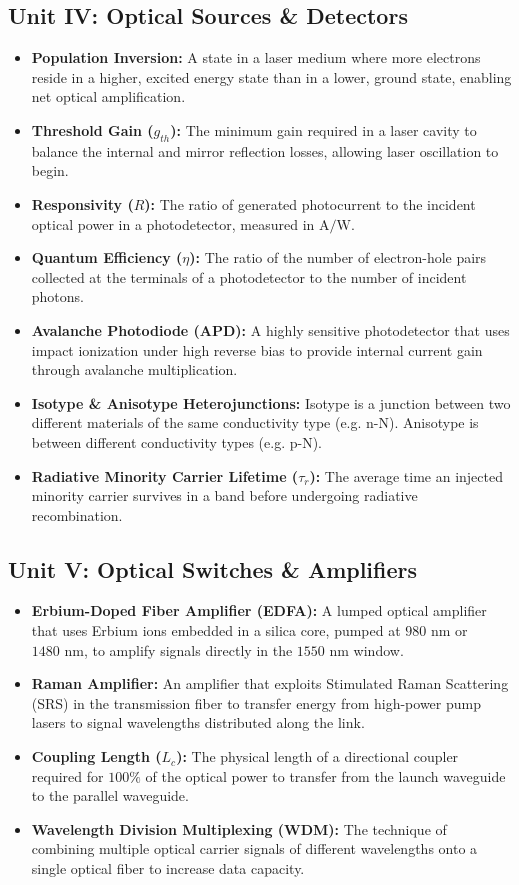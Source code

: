 \subsection{Unit IV: Optical Sources \& Detectors}
\begin{itemize}
  \item   \textbf{Population Inversion:} A state in a laser medium where more electrons reside in a higher, excited energy state than in a lower, ground state, enabling net optical amplification.
  \item   \textbf{Threshold Gain ($g_{th}$):} The minimum gain required in a laser cavity to balance the internal and mirror reflection losses, allowing laser oscillation to begin.
  \item   \textbf{Responsivity ($R$):} The ratio of generated photocurrent to the incident optical power in a photodetector, measured in $\text{A/W}$.
  \item   \textbf{Quantum Efficiency ($\eta$):} The ratio of the number of electron-hole pairs collected at the terminals of a photodetector to the number of incident photons.
  \item   \textbf{Avalanche Photodiode (APD):} A highly sensitive photodetector that uses impact ionization under high reverse bias to provide internal current gain through avalanche multiplication.
  \item   \textbf{Isotype \& Anisotype Heterojunctions:} Isotype is a junction between two different materials of the same conductivity type (e.g. n-N). Anisotype is between different conductivity types (e.g. p-N).
  \item   \textbf{Radiative Minority Carrier Lifetime ($\tau_r$):} The average time an injected minority carrier survives in a band before undergoing radiative recombination.
\end{itemize}


\subsection{Unit V: Optical Switches \& Amplifiers}
\begin{itemize}
  \item   \textbf{Erbium-Doped Fiber Amplifier (EDFA):} A lumped optical amplifier that uses Erbium ions embedded in a silica core, pumped at $980\text{ nm}$ or $1480\text{ nm}$, to amplify signals directly in the $1550\text{ nm}$ window.
  \item   \textbf{Raman Amplifier:} An amplifier that exploits Stimulated Raman Scattering (SRS) in the transmission fiber to transfer energy from high-power pump lasers to signal wavelengths distributed along the link.
  \item   \textbf{Coupling Length ($L_c$):} The physical length of a directional coupler required for $100\%$ of the optical power to transfer from the launch waveguide to the parallel waveguide.
  \item   \textbf{Wavelength Division Multiplexing (WDM):} The technique of combining multiple optical carrier signals of different wavelengths onto a single optical fiber to increase data capacity.
\end{itemize}

